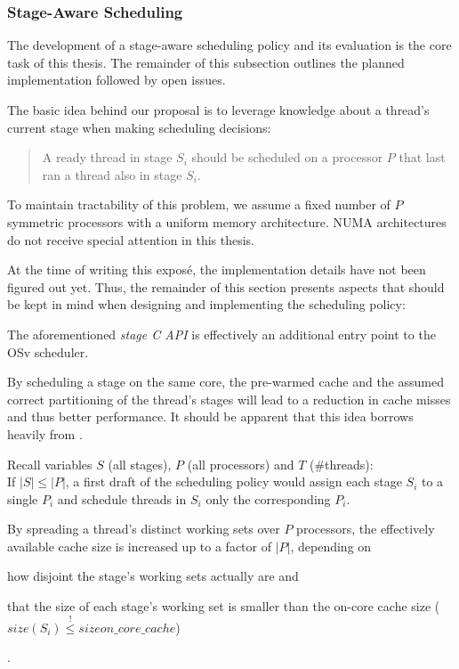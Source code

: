 \documentclass{article}
\begin{document}
\subsubsection{Stage-Aware Scheduling}\label{stageawaresched}

The development of a stage-aware scheduling policy and its evaluation is the core task of this thesis.
The remainder of this subsection outlines the planned implementation followed by open issues.

The basic idea behind our proposal is to leverage knowledge about a thread's current stage when making scheduling decisions:
\begin{quote} %
A ready thread in stage $S_i$ should be scheduled on a processor $P$ that last ran a thread also in stage $S_i$.
\end{quote}

To maintain tractability of this problem, we assume a fixed number of $P$ symmetric processors with a uniform memory architecture.
NUMA architectures do not receive special attention in this thesis. %

At the time of writing this exposé, the implementation details have not been figured out yet.
Thus, the remainder of this section presents aspects that should be kept in mind when designing and implementing the scheduling policy:

The aforementioned \textit{stage C API} is effectively an additional entry point to the OSv scheduler.

By scheduling a stage on the same core, the pre-warmed cache and
the assumed correct partitioning of the thread's stages
will lead to a reduction in cache misses and thus better performance.
It should be apparent that this idea borrows heavily from \cite{sodaspr,cohort}.

Recall variables \textbf{$S$} (all stages), \textbf{$P$} (all processors) and \textbf{$T$} (\#threads):\\
If $|S| \le |P|$, a first draft of the scheduling policy would
assign each stage $S_i$ to a single $P_i$ and schedule threads in $S_i$ only the corresponding $P_i$.

By spreading a thread's distinct working sets over $P$ processors,
the effectively available cache size is increased up to a factor of $|P|$, depending on
\begin{enumerate*}
    \item how disjoint the stage's working sets actually are and
    \item that the size of each stage's working set is smaller than the on-core cache size ($size(S_i) \overset{!}{\le} size{on\_core\_cache}$)
\end{enumerate*}.
\end{document}
